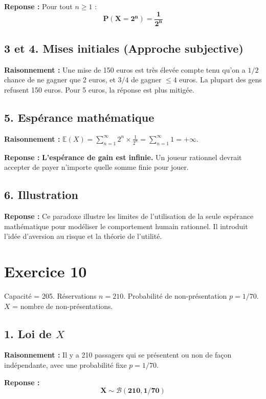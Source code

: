 \documentclass[11pt,a4paper]{article}
\begin{document}
\textbf{Reponse :} Pour tout $n \ge 1$ :
$$
\mathbf{P(X = 2^n) = \frac{1}{2^n}}
$$

\subsection*{3 et 4. Mises initiales (Approche subjective)}

\textbf{Raisonnement :} Une mise de 150 euros est très élevée compte tenu qu'on a $1/2$ chance de ne gagner que 2 euros, et $3/4$ de gagner $\le 4$ euros. La plupart des gens refusent 150 euros. Pour 5 euros, la réponse est plus mitigée.

\subsection*{5. Espérance mathématique}

\textbf{Raisonnement :} $\mathbb{E}(X) = \sum_{n=1}^{\infty} 2^n \times \frac{1}{2^n} = \sum_{n=1}^{\infty} 1 = +\infty$.

\textbf{Reponse :} \textbf{L'espérance de gain est infinie.} Un joueur rationnel devrait accepter de payer n'importe quelle somme finie pour jouer.

\subsection*{6. Illustration}

\textbf{Reponse :} Ce paradoxe illustre les limites de l'utilisation de la seule espérance mathématique pour modéliser le comportement humain rationnel. Il introduit l'idée d'aversion au risque et la théorie de l'utilité.

\hrulefill

\section*{Exercice 10}

Capacité = 205. Réservations $n=210$. Probabilité de non-présentation $p = 1/70$. $X$ = nombre de non-présentations.

\subsection*{1. Loi de $X$}

\textbf{Raisonnement :} Il y a 210 passagers qui se présentent ou non de façon indépendante, avec une probabilité fixe $p = 1/70$.

\textbf{Reponse :} 
$$
\mathbf{X \sim \mathcal{B}(210, 1/70)}
$$
\end{document}

